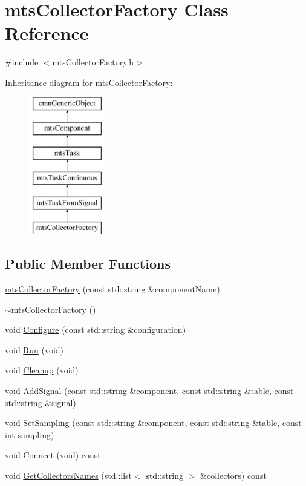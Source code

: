 \hypertarget{classmts_collector_factory}{\section{mts\-Collector\-Factory Class Reference}
\label{classmts_collector_factory}
}


{\ttfamily \#include $<$mts\-Collector\-Factory.\-h$>$}

Inheritance diagram for mts\-Collector\-Factory\-:\begin{figure}[H]
\begin{center}
\leavevmode
\includegraphics[height=6.000000cm]{dd/d72/classmts_collector_factory}
\end{center}
\end{figure}
\subsection*{Public Member Functions}
\begin{DoxyCompactItemize}
\item 
\hyperlink{classmts_collector_factory_a2f05af1940cf1262dccd05f274d2883a}{mts\-Collector\-Factory} (const std\-::string \&component\-Name)
\item 
\hyperlink{classmts_collector_factory_af68fd1ba191ef9de8d967a4830b15325}{$\sim$mts\-Collector\-Factory} ()
\item 
void \hyperlink{classmts_collector_factory_a83f9afdf222ce01c87e8708e1f9bbdf7}{Configure} (const std\-::string \&configuration)
\item 
void \hyperlink{classmts_collector_factory_a06d146dcb006904d4a3e7b6522451089}{Run} (void)
\item 
void \hyperlink{classmts_collector_factory_a951a135f4dcc361993a5ed432dafa24b}{Cleanup} (void)
\item 
void \hyperlink{classmts_collector_factory_aed70853447708f6655c49e85d5814381}{Add\-Signal} (const std\-::string \&component, const std\-::string \&table, const std\-::string \&signal)
\item 
void \hyperlink{classmts_collector_factory_a6ffa178e43fb1d9e1cbcc5d63050c956}{Set\-Sampling} (const std\-::string \&component, const std\-::string \&table, const int sampling)
\item 
void \hyperlink{classmts_collector_factory_ab9f06b99a65163c6cd67f27f878bdbb4}{Connect} (void) const 
\item 
void \hyperlink{classmts_collector_factory_a2934fa6732ae2bd36d384f834e00ffdd}{Get\-Collectors\-Names} (std\-::list$<$ std\-::string $>$ \&collectors) const 
\end{DoxyCompactItemize}
